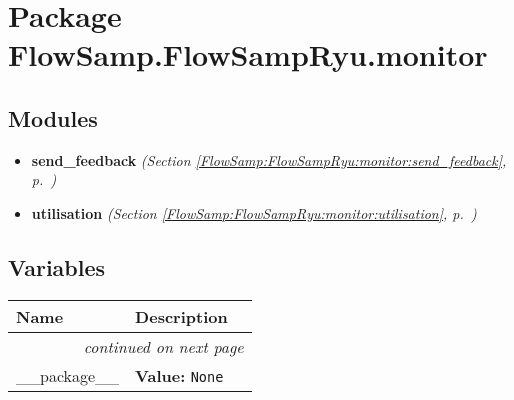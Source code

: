 %
%
%


\section{Package FlowSamp.FlowSampRyu.monitor}

    \label{FlowSamp:FlowSampRyu:monitor}


\subsection{Modules}

\begin{itemize}
\setlength{\parskip}{0ex}
\item \textbf{send\_feedback}
  \textit{(Section \ref{FlowSamp:FlowSampRyu:monitor:send_feedback}, p.~\pageref{FlowSamp:FlowSampRyu:monitor:send_feedback})}

\item \textbf{utilisation}
  \textit{(Section \ref{FlowSamp:FlowSampRyu:monitor:utilisation}, p.~\pageref{FlowSamp:FlowSampRyu:monitor:utilisation})}

\end{itemize}



  \subsection{Variables}

    \vspace{-1cm}
\hspace{\varindent}\begin{longtable}{|p{\varnamewidth}|p{\vardescrwidth}|l}
\cline{1-2}
\cline{1-2} \centering \textbf{Name} & \centering \textbf{Description}& \\
\cline{1-2}
\endhead\cline{1-2}\multicolumn{3}{r}{\small\textit{continued on next page}}\\\endfoot\cline{1-2}
\endlastfoot\raggedright \_\-\_\-p\-a\-c\-k\-a\-g\-e\-\_\-\_\- & \raggedright \textbf{Value:} 
{\tt None}&\\
\cline{1-2}
\end{longtable}

